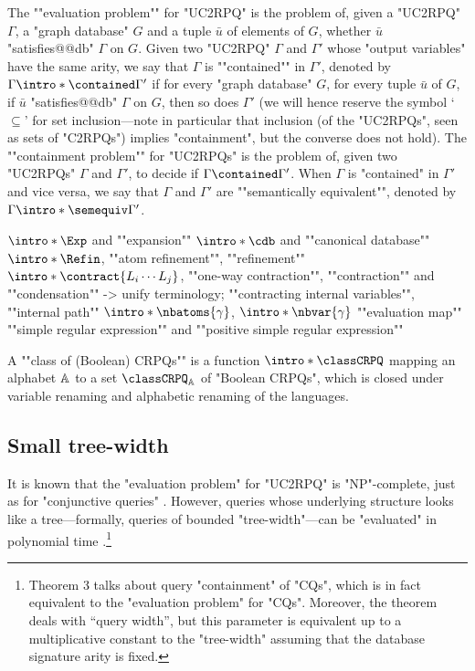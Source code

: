\AP %
The ""evaluation problem"" for "UC2RPQ" is the problem of, given
a "UC2RPQ" $\Gamma$, a "graph database" $G$ and a tuple $\bar u$ of elements of $G$,
whether $\bar u$ "satisfies@@db" $\Gamma$ on $G$. 
Given two "UC2RPQ" $\Gamma$
and $\Gamma'$ whose "output variables" have the same arity,
we say that $\Gamma$ is \AP""contained"" in $\Gamma'$,
denoted by $\Gamma \intro*\contained \Gamma'$ if
for every "graph database" $G$, for every tuple $\bar u$ of $G$,
if $\bar u$ "satisfies@@db" $\Gamma$ on $G$, then so does $\Gamma'$ (we will hence reserve the symbol `$\subseteq$' for set inclusion---note in particular that inclusion (of the "UC2RPQs", seen as sets of "C2RPQs") implies "containment", but the converse does not hold). 
The \AP""containment problem"" for "UC2RPQs" is the problem of, given
two "UC2RPQs" $\Gamma$ and $\Gamma'$, to decide if $\Gamma \contained \Gamma'$.
When $\Gamma$ is "contained" in $\Gamma'$ and vice versa, we say that
$\Gamma$ and $\Gamma'$ are \AP""semantically equivalent"", denoted by
$\Gamma \intro*\semequiv \Gamma'$. 

\begin{itemize}
	\itemAP $\intro*\Exp$ and ""expansion""
	\itemAP $\intro*\cdb$ and ""canonical database""
	\itemAP $\intro*\Refin$, ""atom refinement"", ""refinement""
	\itemAP $\intro*\contract{L_i \cdots L_{j}}$, ""one-way contraction"", ""contraction"" and ""condensation"" -> unify terminology; ""contracting internal variables"", ""internal path""
	\itemAP $\intro*\nbatoms{\gamma}$, $\intro*\nbvar{\gamma}$
	\itemAP ""evaluation map""
	\itemAP ""simple regular expression"" and ""positive simple regular expression""
\end{itemize}

A \AP""class of (Boolean) CRPQs"" is a function \AP$\intro*\classCRPQ$ mapping an alphabet $\mathbb{A}$ 
to a set $\classCRPQ_{\A}$ of "Boolean CRPQs", which is closed under variable renaming and alphabetic
renaming of the languages.

\subsection{Small tree-width}


It is known that the "evaluation problem" for "UC2RPQ" is "NP"-complete, just as for "conjunctive queries"
\cite[Theorem 7]{ChandraMerlin1977Implementation}.
However, queries whose underlying structure looks like a tree---formally, queries of bounded 
"tree-width"---can be "evaluated" in polynomial time \cite[Theorem 3]{ChekuriRajaraman2000Containment}.\footnote{Theorem 3 talks about query "containment" of "CQs", which is in fact equivalent to the "evaluation problem" for "CQs". Moreover, the theorem deals with ``query width'', but this parameter is equivalent up to a multiplicative constant to the "tree-width" \cite[Lemma 2]{ChekuriRajaraman2000Containment} assuming that the database signature arity is fixed.} 

